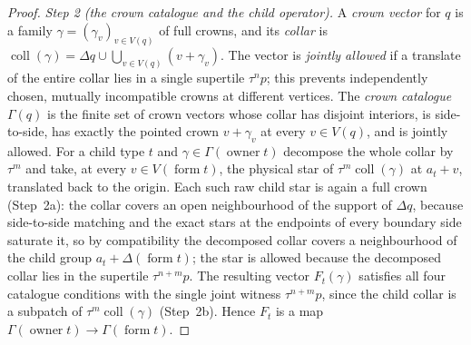 \begin{proof}
\emph{Step 2 (the crown catalogue and the child operator).}  A \emph{crown
vector} for $q$ is a family $\gamma=(\gamma_v)_{v\in V(q)}$ of full crowns,
and its \emph{collar} is
$\operatorname{coll}(\gamma)=\Delta q\cup\bigcup_{v\in V(q)}(v+\gamma_v)$.
The vector is \emph{jointly allowed} if a translate of the entire collar
lies in a single supertile $\tau^n p$; this prevents independently chosen,
mutually incompatible crowns at different vertices.  The \emph{crown
catalogue} $\Gamma(q)$ is the finite set of crown vectors whose collar has
disjoint interiors, is side-to-side, has exactly the pointed crown
$v+\gamma_v$ at every $v\in V(q)$, and is jointly allowed.  For a child type
$t$ and $\gamma\in\Gamma(\operatorname{owner}t)$ decompose the whole collar
by $\tau^m$ and take, at every $v\in V(\operatorname{form}t)$, the physical
star of $\tau^m\operatorname{coll}(\gamma)$ at $a_t+v$, translated back to
the origin.  Each such raw child star is again a full crown (Step~2a): the
collar covers an open neighbourhood of the support of $\Delta q$, because
side-to-side matching and the exact stars at the endpoints of every
boundary side saturate it, so by compatibility the decomposed collar covers
a neighbourhood of the child group $a_t+\Delta(\operatorname{form}t)$; the
star is allowed because the decomposed collar lies in the supertile
$\tau^{n+m}p$.  The resulting vector $F_t(\gamma)$ satisfies all four
catalogue conditions with the single joint witness $\tau^{n+m}p$, since the
child collar is a subpatch of $\tau^m\operatorname{coll}(\gamma)$
(Step~2b).  Hence $F_t$ is a map
$\Gamma(\operatorname{owner}t)\to\Gamma(\operatorname{form}t)$.


\end{proof}
